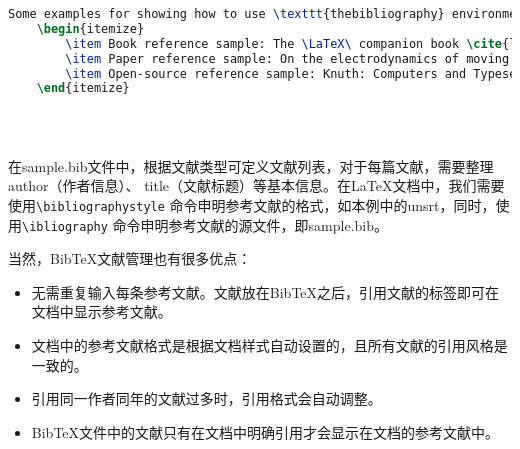 \begin{lstlisting}[language=TeX]
    Some examples for showing how to use \texttt{thebibliography} environment:
    \begin{itemize}
        \item Book reference sample: The \LaTeX\ companion book \cite{latexcompanion}.
        \item Paper reference sample: On the electrodynamics of moving bodies \cite{einstein}.
        \item Open-source reference sample: Knuth: Computers and Typesetting \cite{knuthwebsite}.
    \end{itemize}

    
    
\end{lstlisting}

在sample.bib文件中，根据文献类型可定义文献列表，对于每篇文献，需要整理author（作者信息）、
title（文献标题）等基本信息。在LaTeX文档中，我们需要使用\texttt{\textbackslash{}bibliographystyle}
命令申明参考文献的格式，如本例中的unsrt，同时，使用\texttt{\textbackslash{}ibliography}
命令申明参考文献的源文件，即sample.bib。

当然，BibTeX文献管理也有很多优点：
\begin{itemize}
    \item 无需重复输入每条参考文献。文献放在BibTeX之后，引用文献的标签即可在文档中显示参考文献。
    \item 文档中的参考文献格式是根据文档样式自动设置的，且所有文献的引用风格是一致的。
    \item 引用同一作者同年的文献过多时，引用格式会自动调整。
    \item BibTeX文件中的文献只有在文档中明确引用才会显示在文档的参考文献中。
\end{itemize}

